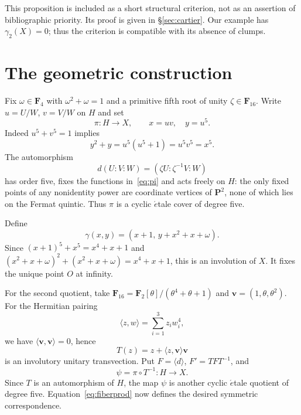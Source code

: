 \documentclass[11pt,a4paper,reqno]{amsart}
\newcommand{\FF}{\mathbf F}
\newcommand{\PP}{\mathbf P}
\begin{document}
This proposition is included as a short structural criterion, not as an
assertion of bibliographic priority. Its proof is given in
\S\ref{sec:cartier}.  Our example has $\gamma_2(X)=0$; thus the
criterion is compatible with its absence of clumps.

\section{The geometric construction}\label{sec:construction}
Fix $\omega\in\FF_4$ with $\omega^2+\omega=1$ and a primitive fifth
root of unity $\zeta\in\FF_{16}$. Write $u=U/W$, $v=V/W$ on $H$ and set
\begin{equation}\label{eq:pi}
  \pi:H\longrightarrow X,\qquad x=uv,\quad y=u^5.
\end{equation}
Indeed $u^5+v^5=1$ implies
\[
   y^2+y=u^5(u^5+1)=u^5v^5=x^5.
\]
The automorphism
\[
 d(U:V:W)=(\zeta U:\zeta^{-1}V:W)
\]
has order five, fixes the functions in~\eqref{eq:pi} and acts freely
on $H$: the only fixed points of any nonidentity power are coordinate
vertices of $\PP^2$, none of which lies on the Fermat quintic. Thus
$\pi$ is a cyclic \(\acute{e}\)tale cover of degree five.

Define
\begin{equation}\label{eq:gamma}
  \gamma(x,y)=(x+1,\,y+x^2+x+\omega).
\end{equation}
Since $(x+1)^5+x^5=x^4+x+1$ and
$(x^2+x+\omega)^2+(x^2+x+\omega)=x^4+x+1$,
this is an involution of $X$. It fixes the unique point $O$ at infinity.

For the second quotient, take $\FF_{16}=\FF_2[\theta]/(\theta^4+\theta+1)$
and $\mathbf v=(1,\theta,\theta^2)$. For the Hermitian pairing
\[
  \langle z,w\rangle=\sum_{i=1}^3z_iw_i^4,
\]
we have $\langle\mathbf v,\mathbf v\rangle=0$, hence
\[
  T(z)=z+\langle z,\mathbf v\rangle\mathbf v
\]
is an involutory unitary transvection.  Put
$F=\langle d\rangle$, $F'=TFT^{-1}$, and
\[
    \psi=\pi\circ T^{-1}:H\longrightarrow X.
\]
Since $T$ is an automorphism of $H$, the map $\psi$ is another cyclic
\(\acute{e}\)tale quotient of degree five.  Equation~\eqref{eq:fiberprod}
now defines the desired symmetric correspondence.
\end{document}
